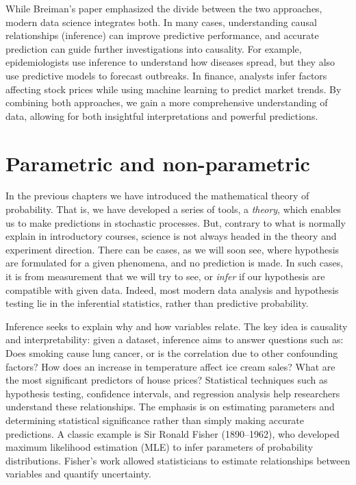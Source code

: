 \documentclass{book}
\begin{document}
While Breiman’s paper emphasized the divide between the two approaches, modern data science integrates both. In many cases, understanding causal relationships (inference) can improve predictive performance, and accurate prediction can guide further investigations into causality. For example, epidemiologists use inference to understand how diseases spread, but they also use predictive models to forecast outbreaks. In finance, analysts infer factors affecting stock prices while using machine learning to predict market trends. By combining both approaches, we gain a more comprehensive understanding of data, allowing for both insightful interpretations and powerful predictions.

\newpage
\section{Parametric and non-parametric}

In the previous chapters we have introduced the mathematical theory of probability. That is, we have developed a series of tools, a \textit{theory}, which enables us to make predictions in stochastic processes. But, contrary to what is normally explain in introductory courses, science is not always headed in the theory and experiment direction. There can be cases, as we will soon see, where hypothesis are formulated for a given phenomena, and no prediction is made. In such cases, it is from measurement that we will try to see, or \textit{infer} if our hypothesis are compatible with given data. Indeed, most modern data analysis and hypothesis testing lie in the inferential statistics, rather than predictive probability.

Inference seeks to explain why and how variables relate. The key idea is causality and interpretability: given a dataset, inference aims to answer questions such as: Does smoking cause lung cancer, or is the correlation due to other confounding factors? How does an increase in temperature affect ice cream sales? What are the most significant predictors of house prices? Statistical techniques such as hypothesis testing, confidence intervals, and regression analysis help researchers understand these relationships. The emphasis is on estimating parameters and determining statistical significance rather than simply making accurate predictions. A classic example is Sir Ronald Fisher (1890–1962), who developed maximum likelihood estimation (MLE) to infer parameters of probability distributions. Fisher’s work allowed statisticians to estimate relationships between variables and quantify uncertainty.\\
\end{document}
